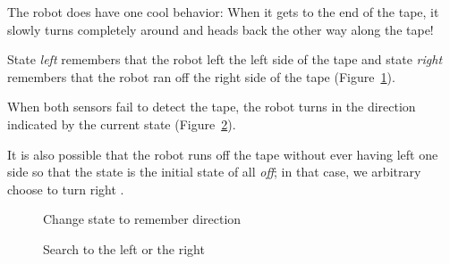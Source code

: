 \documentclass[12pt,a4paper,english]{article}
\begin{document}
The robot does have one cool behavior: When it gets to the end of the
tape, it slowly turns completely around and heads back the other way
along the tape!

State \emph{left}  remembers that the robot left the
left side of the tape and state \emph{right} 
remembers that the robot ran off the right side of the tape
(Figure~\ref{fig.follow3}).

When both sensors fail to detect the tape, the robot turns in the
direction indicated by the current state (Figure~\ref{fig.follow1}).

It is also possible that the robot runs off the tape without ever having
left one side so that the state is the initial state of all \emph{off};
in that case, we arbitrary choose to turn right .

\begin{figure}
\begin{center}
\caption{Change state to remember direction}\label{fig.follow3}
\end{center}
\end{figure}

\begin{figure}
\begin{center}
\caption{Search to the left or the right}\label{fig.follow1}
\end{center}
\end{figure}
\end{document}
